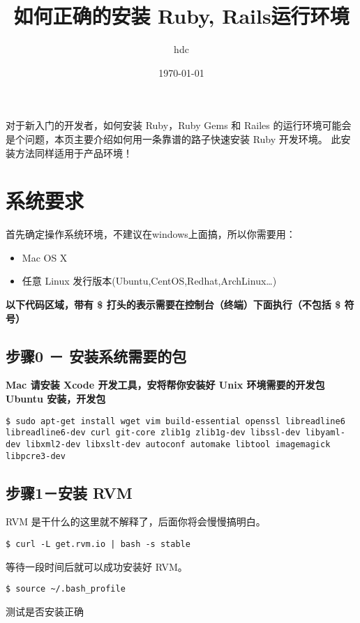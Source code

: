 \documentclass[11pt]{article}
\title{如何正确的安装 Ruby, Rails运行环境}
\author{hdc}
\date{\today}
\begin{document}
\maketitle

\setcounter{tocdepth}{3}
\tableofcontents
\vspace*{1cm}
对于新入门的开发者，如何安装 Ruby，Ruby Gems 和 Railes 的运行环境可能会是个问题，本页主要介绍如何用一条靠谱的路子快速安装 Ruby 开发环境。
此安装方法同样适用于产品环境！


\section{\textbf{系统要求}}
\label{sec-1}

首先确定操作系统环境，不建议在windows上面搞，所以你需要用：
\begin{itemize}
\item Mac OS X
\item 任意 Linux 发行版本(Ubuntu,CentOS,Redhat,ArchLinux\ldots{})
\end{itemize}
\textbf{以下代码区域，带有 \$ 打头的表示需要在控制台（终端）下面执行（不包括 \$ 符号）}
\subsection{步骤0 － 安装系统需要的包}
\label{sec-1-1}

\textbf{Mac 请安装 Xcode 开发工具，安将帮你安装好 Unix 环境需要的开发包}
\textbf{Ubuntu 安装，开发包}

\begin{verbatim}
$ sudo apt-get install wget vim build-essential openssl libreadline6 libreadline6-dev curl git-core zlib1g zlib1g-dev libssl-dev libyaml-dev libxml2-dev libxslt-dev autoconf automake libtool imagemagick libpcre3-dev
\end{verbatim}
\subsection{步骤1－安装 RVM}
\label{sec-1-2}

RVM 是干什么的这里就不解释了，后面你将会慢慢搞明白。

\begin{verbatim}
$ curl -L get.rvm.io | bash -s stable
\end{verbatim}
等待一段时间后就可以成功安装好 RVM。

\begin{verbatim}
$ source ~/.bash_profile
\end{verbatim}
测试是否安装正确
\end{document}
